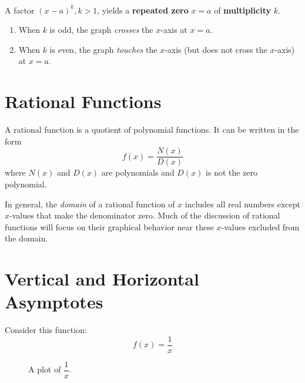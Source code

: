 \begin{proposition}\cite{ci}
    ~\\
    A factor $(x-a)^k, k>1$, yields a \textbf{repeated zero} $x=a$ of \textbf{multiplicity} $k$.
    \begin{enumerate}
        \item When $k$ is odd, the graph \textit{crosses} the $x$-axis at $x=a$.
        \item When $k$ is even, the graph \textit{touches} the $x$-axis (but does not cross the $x$-axis) at $x=a$.
    \end{enumerate}
\end{proposition}

\section{Rational Functions}

A rational function is a quotient of polynomial functions. It can be written in the form
$$f(x)=\dfrac{N(x)}{D(x)}$$
where $N(x)$ and $D(x)$ are polynomials and $D(x)$ is not the zero polynomial.\cite{ci}

In general, the \textit{domain} of a rational function of $x$ includes all real numbers except $x$-values that make the denominator zero. Much of the discussion of rational functions will focus on their graphical behavior near these $x$-values excluded from the domain. \cite{ci}

\section{Vertical and Horizontal Asymptotes}

Consider this function:
$$f(x) = \dfrac{1}{x}$$

\begin{figure}[H]
    \centering
    \caption{A plot of $\dfrac{1}{x}$.}
    \label{plot:1/x}
\end{figure}

